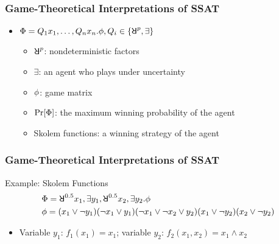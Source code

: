 \begin{frame}
      \frametitle{Game-Theoretical Interpretations of SSAT}
      \begin{itemize}
            \item $\Qf=Q_1 x_1,\ldots,Q_n x_n.\pf,Q_i\in\{\random{p},\exists\}$
                  \pause
                  \begin{itemize}
                        \item $\random{p}$: nondeterministic factors
                              \pause
                        \item $\exists$: an agent who plays under uncertainty
                              \pause
                        \item $\phi$: game matrix
                              \pause
                        \item $\Pr[\Phi]$: the maximum winning probability of the agent
                              \pause
                        \item \alert{Skolem functions}: a winning strategy of the agent
                  \end{itemize}
      \end{itemize}
\end{frame}

\begin{frame}
      \frametitle{Game-Theoretical Interpretations of SSAT}
      \begin{block}{Example: Skolem Functions}
            \abovedisplayskip=0pt
            \belowdisplayskip=0pt
            \begin{align*}
                   & \Qf=\random{0.5} x_1, \exists y_1, \random{0.5} x_2, \exists y_2. \pf \\
                   & \pf=(x_1 \lor \lnot y_1)
                  (\lnot x_1 \lor y_1)
                  (\lnot x_1 \lor \lnot x_2 \lor y_2)
                  (x_1 \lor \lnot y_2)
                  (x_2 \lor \lnot y_2)
            \end{align*}
            \pause
            \begin{itemize}
                  \item Variable $y_1$: $f_1(x_1)=x_1$; variable $y_2$: $f_2(x_1,x_2)=x_1 \land x_2$
            \end{itemize}
      \end{block}
\end{frame}